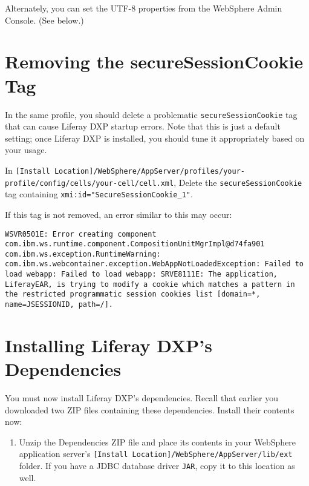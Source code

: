\noindent\hrulefill

Alternately, you can set the UTF-8 properties from the WebSphere Admin
Console. (See below.)

\section{Removing the secureSessionCookie
Tag}\label{removing-the-securesessioncookie-tag}

In the same profile, you should delete a problematic
\texttt{secureSessionCookie} tag that can cause Liferay DXP startup
errors. Note that this is just a default setting; once Liferay DXP is
installed, you should tune it appropriately based on your usage.

In
\texttt{{[}Install\ Location{]}/WebSphere/AppServer/profiles/your-profile/config/cells/your-cell/cell.xml},
Delete the \texttt{secureSessionCookie} tag containing
\texttt{xmi:id="SecureSessionCookie\_1"}.

If this tag is not removed, an error similar to this may occur:

\begin{verbatim}
WSVR0501E: Error creating component com.ibm.ws.runtime.component.CompositionUnitMgrImpl@d74fa901
com.ibm.ws.exception.RuntimeWarning: com.ibm.ws.webcontainer.exception.WebAppNotLoadedException: Failed to load webapp: Failed to load webapp: SRVE8111E: The application, LiferayEAR, is trying to modify a cookie which matches a pattern in the restricted programmatic session cookies list [domain=*, name=JSESSIONID, path=/].
\end{verbatim}

\section{Installing Liferay DXP's
Dependencies}\label{installing-liferay-dxps-dependencies}

You must now install Liferay DXP's dependencies. Recall that earlier you
downloaded two ZIP files containing these dependencies. Install their
contents now:

\begin{enumerate}
\def\labelenumi{\arabic{enumi}.}
\tightlist
\item
  Unzip the Dependencies ZIP file and place its contents in your
  WebSphere application server's
  \texttt{{[}Install\ Location{]}/WebSphere/AppServer/lib/ext} folder.
  If you have a JDBC database driver \texttt{JAR}, copy it to this
  location as well.
\end{enumerate}

